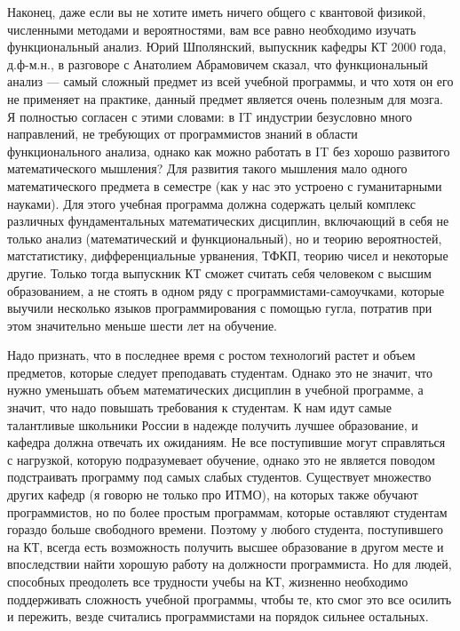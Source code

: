 \documentclass[russian]{article}
\begin{document}
Наконец, даже если вы не хотите иметь ничего общего с квантовой физикой, численными методами и вероятностями, вам все равно необходимо изучать функциональный анализ. Юрий Шполянский, выпускник кафедры КТ 2000 года, д.ф-м.н., в разговоре с Анатолием Абрамовичем сказал, что функциональный анализ --- самый сложный предмет из всей учебной программы, и что хотя он его не применяет на практике, данный предмет является очень полезным для мозга. Я полностью согласен с этими словами: в IT индустрии безусловно много направлений, не требующих от программистов знаний в области функционального анализа, однако как можно работать в IT без хорошо развитого математического мышления? Для развития такого мышления мало одного математического предмета в семестре (как у нас это устроено с гуманитарными науками). Для этого учебная программа должна содержать целый комплекс различных фундаментальных математических дисциплин, включающий в себя не только анализ (математический и функциональный), но и теорию вероятностей, матстатистику, дифференциальные урванения, ТФКП, теорию чисел и некоторые другие. Только тогда выпускник КТ сможет считать себя человеком с высшим образованием, а не стоять в одном ряду с программистами-самоучками, которые выучили несколько языков программирования с помощью гугла, потратив при этом значительно меньше шести лет на обучение.

Надо признать, что в последнее время с ростом технологий растет и объем предметов, которые следует преподавать студентам. Однако это не значит, что нужно уменьшать объем математических дисциплин в учебной программе, а значит, что надо повышать требования к студентам. К нам идут самые талантливые школьники России в надежде получить лучшее образование, и кафедра должна отвечать их ожиданиям. Не все поступившие могут справляться с нагрузкой, которую подразумевает обучение, однако это не является поводом подстраивать программу под самых слабых студентов. Существует множество других кафедр (я говорю не только про ИТМО), на которых также обучают программистов, но по более простым программам, которые оставляют студентам гораздо больше свободного времени. Поэтому у любого студента, поступившего на КТ, всегда есть возможность получить высшее образование в другом месте и впоследствии найти хорошую работу на должности программиста. Но для людей, способных преодолеть все трудности учебы на КТ, жизненно необходимо поддерживать сложность учебной программы, чтобы те, кто смог это все осилить и пережить, везде считались программистами на порядок сильнее остальных.



\end{document}
